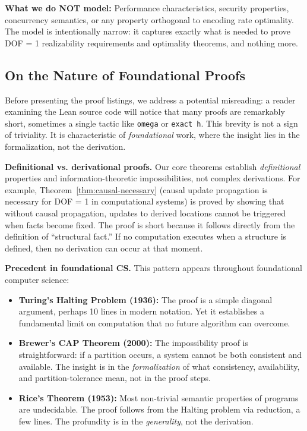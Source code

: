 \textbf{What we do NOT model:} Performance characteristics, security properties, concurrency semantics, or any property orthogonal to encoding rate optimality. The model is intentionally narrow: it captures exactly what is needed to prove DOF = 1 realizability requirements and optimality theorems, and nothing more.

\subsection*{On the Nature of Foundational Proofs}\label{sec:foundational-nature}

Before presenting the proof listings, we address a potential misreading: a reader examining the Lean source code will notice that many proofs are remarkably short, sometimes a single tactic like \texttt{omega} or \texttt{exact h}. This brevity is not a sign of triviality. It is characteristic of \emph{foundational} work, where the insight lies in the formalization, not the derivation.

\textbf{Definitional vs. derivational proofs.} Our core theorems establish \emph{definitional} properties and information-theoretic impossibilities, not complex derivations. For example, Theorem~\ref{thm:causal-necessary} (causal update propagation is necessary for DOF = 1 in computational systems) is proved by showing that without causal propagation, updates to derived locations cannot be triggered when facts become fixed. The proof is short because it follows directly from the definition of ``structural fact.'' If no computation executes when a structure is defined, then no derivation can occur at that moment.

\textbf{Precedent in foundational CS.} This pattern appears throughout foundational computer science:

\begin{itemize}
\item \textbf{Turing's Halting Problem (1936):} The proof is a simple diagonal argument, perhaps 10 lines in modern notation. Yet it establishes a fundamental limit on computation that no future algorithm can overcome.
\item \textbf{Brewer's CAP Theorem (2000):} The impossibility proof is straightforward: if a partition occurs, a system cannot be both consistent and available. The insight is in the \emph{formalization} of what consistency, availability, and partition-tolerance mean, not in the proof steps.
\item \textbf{Rice's Theorem (1953):} Most non-trivial semantic properties of programs are undecidable. The proof follows from the Halting problem via reduction, a few lines. The profundity is in the \emph{generality}, not the derivation.
\end{itemize}

